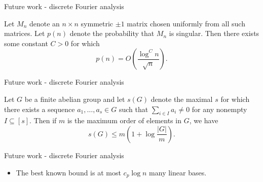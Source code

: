 \documentclass{beamer}
\theoremstyle{plain}
\newtheorem{conjecture}[theorem]{Conjecture}
\newcommand{\Z}{\mathbb{Z}}
\begin{document}




	\begin{frame}{Future work - discrete Fourier analysis}

		\begin{theorem}[A. Ferber - 2020]
			Let $M_n$ denote an $n\times n$ symmetric $\pm 1$ matrix chosen uniformly from all such matrices.
			Let $p(n)$ denote the probability that $M_n$ is singular.
			Then there exists some constant $C>0$ for which
			\[
				p(n) = O\left(\frac{\log^Cn}{\sqrt{n}}\right).
			\]
		\end{theorem}
	\end{frame}


	\begin{frame}{Future work - discrete Fourier analysis}
		\begin{theorem}[R. Meshulam - 1990]
			Let $G$ be a finite abelian group and let $s(G)$ denote the maximal $s$ for which there exists a sequence $a_1, \ldots, a_s\in G$ such that $\sum_{i\in I}a_i \neq 0$ for any nonempty $I\subseteq [s]$.
			Then if $m$ is the maximum order of elements in $G$, we have
			\[
				s(G)\leq m\left(1 + \log\frac{|G|}{m}\right).
			\]
		\end{theorem}	
	\end{frame}


	\begin{frame}{Future work - discrete Fourier analysis}
		\begin{itemize}
			\begin{conjecture}[N. Alon, N. Linial, R. Meshulam - 1988]
				For every prime $p$, there exists a constant $c_p$ such that for any $n\geq 1$, the union of any $c_p$ linear bases for $\Z_p$ forms an additive basis for $\Z_p$.
			\end{conjecture}
			\pause

			\item The best known bound is at most $c_p \log n$ many linear bases.
		\end{itemize}
	\end{frame}
\end{document}

